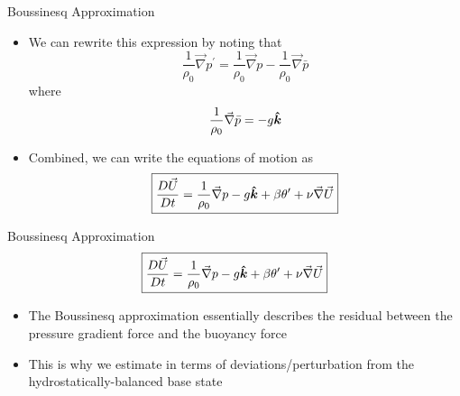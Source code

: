 \begin{frame}{Boussinesq Approximation}

\begin{itemize}
	\item We can rewrite this expression by noting that
	$$\frac{1}{\rho_0}\vec{\nabla}  p^\prime = \frac{1}{\rho_0}\vec{\nabla} p - \frac{1}{\rho_0}\vec{\nabla}  \bar p$$
	where $$\frac{1}{\rho_0}\vec{\nabla}  \bar p = -g\boldsymbol{\hat{k}}$$
	
	\item Combined, we can write the equations of motion as
	$$\boxed{\frac{D\vec U}{Dt} = \frac{1}{\rho_0}\vec{\nabla} p -g\boldsymbol{\hat{k}}+ \beta \theta^\prime + \nu \vec{\nabla}\vec{U}}$$
	\end{itemize}
\end{frame}
\begin{frame}{Boussinesq Approximation}
$$\boxed{\frac{D\vec U}{Dt} = \frac{1}{\rho_0}\vec{\nabla} p -g\boldsymbol{\hat{k}}+ \beta \theta^\prime + \nu \vec{\nabla}\vec{U}}$$
\begin{itemize}
	\item The Boussinesq approximation essentially describes the residual between the pressure gradient force and the buoyancy force
	\item This is why we estimate in terms of deviations/perturbation from the hydrostatically-balanced base state
	\end{itemize}
\end{frame}



